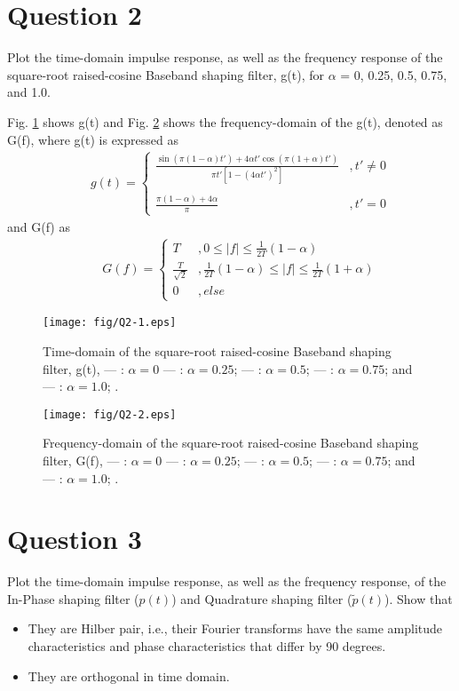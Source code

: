 \documentclass[journal]{IEEEtran}
\begin{document}
\section{Question 2}
Plot the time-domain impulse response, as well as the frequency response of the square-root raised-cosine Baseband shaping filter, g(t), for $\alpha$ = 0, 0.25, 0.5, 0.75, and 1.0.

Fig. \ref{fig2} shows g(t) and Fig. \ref{fig3} shows the frequency-domain of the g(t), denoted as G(f), where g(t) is expressed as
\begin{eqnarray}
&& g(t) = \left\{
\begin{array}{ll}
\frac{\sin(\pi(1-\alpha)t') + 4\alpha t' \cos(\pi(1+\alpha)t')}{\pi t' [1-(4\alpha t')^2]} & ,t' \neq 0
\\ \\
\frac{\pi (1 -\alpha) + 4 \alpha}{\pi} & ,t' = 0
\end{array}
\right.
\end{eqnarray}
and G(f) as
\begin{eqnarray}
&& G(f) = \left\{
\begin{array}{ll}
T & ,0 \leq |f| \leq \frac{1}{2T}(1-\alpha) \\
\frac{T}{\sqrt{2}} & ,\frac{1}{2T}(1-\alpha) \leq |f| \leq \frac{1}{2T}(1+\alpha) \\
0 & ,else
\end{array}
\right.
\end{eqnarray}

\begin{figure}[!htbp]
\center
\texttt{[image: fig/Q2-1.eps]}
\caption{Time-domain of the square-root raised-cosine Baseband shaping filter, g(t),
--- : $\alpha = 0$
{\color{red} ---} : $\alpha = 0.25$;
{\color{blue} ---} : $\alpha = 0.5$;
{\color{green} ---} : $\alpha = 0.75$;
and {\color{yellow} ---} : $\alpha = 1.0$;
.}
\label{fig2}
\end{figure}

\begin{figure}[!htbp]
\center
\texttt{[image: fig/Q2-2.eps]}
\caption{Frequency-domain of the square-root raised-cosine Baseband shaping filter, G(f),
--- : $\alpha = 0$
{\color{red} ---} : $\alpha = 0.25$;
{\color{blue} ---} : $\alpha = 0.5$;
{\color{green} ---} : $\alpha = 0.75$;
and {\color{yellow} ---} : $\alpha = 1.0$;
.}
\label{fig3}
\end{figure}

\section{Question 3}
Plot the time-domain impulse response, as well as the frequency response, of the In-Phase shaping filter ($p(t)$) and Quadrature shaping filter ($\tilde{p}(t)$). 
Show that 
\begin{itemize}
\item They are Hilber pair, i.e., their Fourier transforms have the same amplitude 
characteristics and phase characteristics that differ by 90 degrees.
\item They are orthogonal in time domain. 
\end{itemize}
\end{document}
